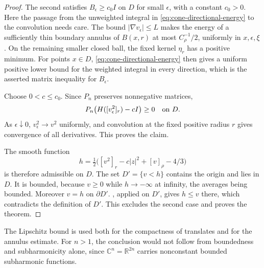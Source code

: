 \begin{proof}
The second satisfies $B_\epsilon\geq c_0I$ on $D$ for small $\epsilon$, with a constant $c_0>0$. Here the passage from the unweighted integral in \eqref{eq:cone-directional-energy} to the convolution needs care. The bound $|\nabla v_\epsilon|\leq L$ makes the energy of a sufficiently thin boundary annulus of $B(x,r)$ at most $C_\rho^{-1}/2$, uniformly in $x,\epsilon,\xi$. On the remaining smaller closed ball, the fixed kernel $\eta_r$ has a positive minimum. For points $x\in D$, \eqref{eq:cone-directional-energy} then gives a uniform positive lower bound for the weighted integral in every direction, which is the asserted matrix inequality for $B_\epsilon$.

Choose $0<c\leq c_0$. Since $P_n$ preserves nonnegative matrices,
\[
 P_n\bigl(H([v_\epsilon^2]_r)-cI\bigr)\geq0
       \quad\hbox{on }D.
\]
As $\epsilon\downarrow0$, $v_\epsilon^2\to v^2$ uniformly, and convolution at the fixed positive radius $r$ gives convergence of all derivatives. This proves the claim.

The smooth function
\[
 h=\tfrac12\bigl([v^2]_r-c|z|^2+[v]_\rho-4/3\bigr)
\]
is therefore admissible on $D$. The set $D'=\{v<h\}$ contains the origin and lies in $D$. It is bounded, because $v\geq0$ while $h\to-\infty$ at infinity, the averages being bounded. Moreover $v=h$ on $\partial D'$. , applied on $D'$, gives $h\leq v$ there, which contradicts the definition of $D'$. This excludes the second case and proves the theorem.
\end{proof}

The Lipschitz bound is used both for the compactness of translates and for the annulus estimate. For $n>1$, the conclusion would not follow from boundedness and subharmonicity alone, since $\mathbb C^n=\mathbb R^{2n}$ carries nonconstant bounded subharmonic functions.

